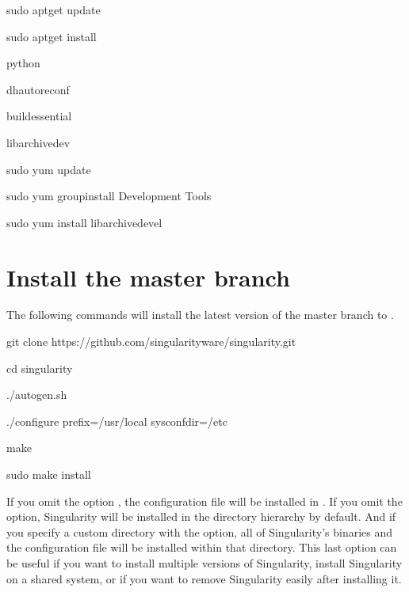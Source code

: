 \documentclass[letterpaper,10pt,english]{sphinxmanual}
\begin{document}
%
\begin{sphinxVerbatim}[commandchars=\\\{\}]
\PYGZdl{} sudo apt\PYGZhy{}get update \PYGZam{}\PYGZam{} \PYGZbs{}

    sudo apt\PYGZhy{}get install \PYGZbs{}

    python \PYGZbs{}

    dh\PYGZhy{}autoreconf \PYGZbs{}

    build\PYGZhy{}essential \PYGZbs{}

    libarchive\PYGZhy{}dev
\end{sphinxVerbatim}

%
\begin{sphinxVerbatim}[commandchars=\\\{\}]
\PYGZdl{} sudo yum update \PYGZam{}\PYGZam{} \PYGZbs{}

    sudo yum groupinstall \PYGZsq{}Development Tools\PYGZsq{} \PYGZam{}\PYGZam{} \PYGZbs{}

    sudo yum install libarchive\PYGZhy{}devel
\end{sphinxVerbatim}


\section{Install the master branch}
\label{\detokenize{installation:install-the-master-branch}}
The following commands will install the latest version of the  master branch to .

%
\begin{sphinxVerbatim}[commandchars=\\\{\}]
\PYGZdl{} git clone https://github.com/singularityware/singularity.git

\PYGZdl{} cd singularity

\PYGZdl{} ./autogen.sh

\PYGZdl{} ./configure \PYGZhy{}\PYGZhy{}prefix=/usr/local \PYGZhy{}\PYGZhy{}sysconfdir=/etc

\PYGZdl{} make

\PYGZdl{} sudo make install
\end{sphinxVerbatim}

If you omit the  option , the configuration file will be installed in .
If you omit the  option, Singularity will be installed in the  directory
hierarchy by default. And if you specify a custom directory with the 
option, all of Singularity’s binaries and the configuration file will
be installed within that directory. This last option can be useful if
you want to install multiple versions of Singularity, install
Singularity on a shared system, or if you want to remove Singularity
easily after installing it.
\end{document}
